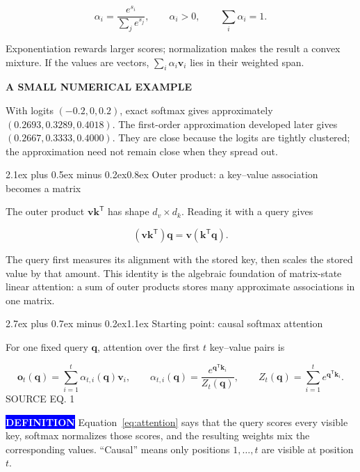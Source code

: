 \documentclass[11pt]{article}
\makeatletter
\newcommand{\vect}[1]{\bm{#1}}
\newcommand{\trans}{^{\mathsf T}}
\newcommand{\sourceeq}[1]{\hfill{\sffamily\scriptsize\color{Muted}SOURCE EQ. #1}}
\newcommand{\badge}[2]{%
  \begingroup\setlength{\fboxsep}{3.5pt}%
  \colorbox{#1}{\textcolor{white}{\sffamily\bfseries\scriptsize #2}}%
  \endgroup
}
\newenvironment{graybox}[1]{%
  \def\FrameCommand{\fcolorbox{RuleGray}{PaperGray}}%
  \MakeFramed{\advance\hsize-\width\FrameRestore}%
  {\sffamily\bfseries\color{Ink}#1}\par\smallskip
}{\endMakeFramed}
\renewcommand\section{\@startsection{section}{1}{0pt}%
  {2.7ex plus 0.7ex minus 0.2ex}{1.1ex}%
  {\normalfont\sffamily\Large\bfseries\color{Ink}}}
\renewcommand\subsection{\@startsection{subsection}{2}{0pt}%
  {2.1ex plus 0.5ex minus 0.2ex}{0.8ex}%
  {\normalfont\sffamily\large\bfseries\color{Ink}}}
\makeatother
\begin{document}
\[
  \alpha_i=\frac{e^{s_i}}{\sum_j e^{s_j}},
  \qquad \alpha_i>0,
  \qquad \sum_i\alpha_i=1.
\]

Exponentiation rewards larger scores; normalization makes the result a convex
mixture. If the values are vectors, $\sum_i\alpha_i\vect v_i$ lies in their
weighted span.

\begin{graybox}{A SMALL NUMERICAL EXAMPLE}
  With logits $(-0.2,0,0.2)$, exact softmax gives approximately
  $(0.2693,0.3289,0.4018)$. The first-order approximation developed later gives
  $(0.2667,0.3333,0.4000)$. They are close because the logits are tightly
  clustered; the approximation need not remain close when they spread out.
\end{graybox}

\subsection{Outer product: a key--value association becomes a matrix}

The outer product $\vect v\vect k\trans$ has shape $d_v\times d_k$. Reading it
with a query gives

\[
  (\vect v\vect k\trans)\vect q
  =\vect v(\vect k\trans\vect q).
\]

The query first measures its alignment with the stored key, then scales the
stored value by that amount. This identity is the algebraic foundation of
matrix-state linear attention: a sum of outer products stores many approximate
associations in one matrix.

\section{Starting point: causal softmax attention}

For one fixed query $\vect q$, attention over the first $t$ key--value pairs is

\begin{equation}
  \vect o_t(\vect q)
  =\sum_{i=1}^{t}\alpha_{t,i}(\vect q)\vect v_i,
  \qquad
  \alpha_{t,i}(\vect q)
  =\frac{e^{\vect q\trans\vect k_i}}{Z_t(\vect q)},
  \qquad
  Z_t(\vect q)=\sum_{i=1}^{t}e^{\vect q\trans\vect k_i}.
  \tag{1}\label{eq:attention}
\end{equation}
\sourceeq{1}

\badge{Blue}{DEFINITION} Equation~\eqref{eq:attention} says that the query
scores every visible key, softmax normalizes those scores, and the resulting
weights mix the corresponding values. ``Causal'' means only positions
$1,\ldots,t$ are visible at position $t$.
\end{document}
